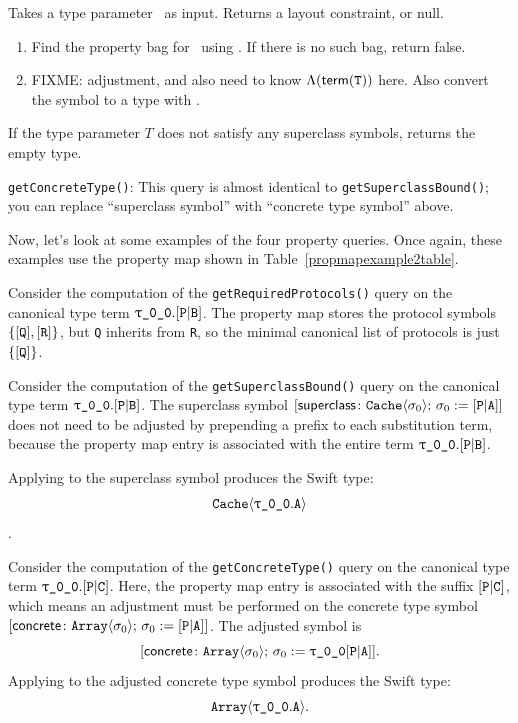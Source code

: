 \documentclass[../generics]{subfiles}
\begin{document}
\begin{algorithm}\label{alg:get superclass bound}
Takes a type parameter \tT\ as input. Returns a layout constraint, or null.
\begin{enumerate}
\item Find the property bag for \tT\ using . If there is no such bag, return false.
\item FIXME: adjustment, and also need to know $\Lambda(\mathsf{term}(\texttt{T}))$ here. Also convert the symbol to a type with .
\end{enumerate}

  If the type parameter $T$ does not satisfy any superclass symbols, returns the empty type.

\end{algorithm}

\begin{algorithm}\label{alg:get concrete type}
\texttt{getConcreteType()}: This query is almost identical to \texttt{getSuperclassBound()}; you can replace ``superclass symbol'' with ``concrete type symbol'' above.
\end{algorithm}

Now, let's look at some examples of the four property queries. Once again, these examples use the property map shown in Table~\ref{propmapexample2table}.
\begin{example}
Consider the computation of the \texttt{getRequiredProtocols()} query on the canonical type term $\rT.\assocsym{P}{B}$. The property map stores the protocol symbols $\{[\texttt{Q}],[\texttt{R}]\}$, but \texttt{Q} inherits from \texttt{R}, so the minimal canonical list of protocols is just $\{[\texttt{Q}]\}$.
\end{example}
\begin{example}
Consider the computation of the \texttt{getSuperclassBound()} query on the canonical type term $\rT.\assocsym{P}{B}$.
The superclass symbol $[\mathsf{superclass}\colon \texttt{Cache}\langle\sigma_0\rangle;\,\sigma_0:=[\texttt{P}|\texttt{A}]]$ does not need to be adjusted by prepending a prefix to each substitution term, because the property map entry is associated with the entire term $\rT.\assocsym{P}{B}$.

Applying  to the superclass symbol produces the Swift type:
\[\texttt{Cache}\langle\rT.\nA\rangle\].
\end{example}
\begin{example}
Consider the computation of the \texttt{getConcreteType()} query on the canonical type term $\rT.\assocsym{P}{C}$. Here, the property map entry is associated with the suffix $[\texttt{P}|\texttt{C}]$, which means an adjustment must be performed on the concrete type symbol
$[\mathsf{concrete}\colon \texttt{Array}\langle\sigma_0\rangle;\,\sigma_0:=[\texttt{P}|\texttt{A}]]$. The adjusted symbol is
\[\concretesym{\texttt{Array}\langle\sigma_0\rangle;\,\sigma_0:=\rT\assocsym{P}{A}}.\]
Applying  to the adjusted concrete type symbol produces the Swift type:
\[\texttt{Array}\langle\rT.\nA\rangle.\]
\end{example}
\end{document}

